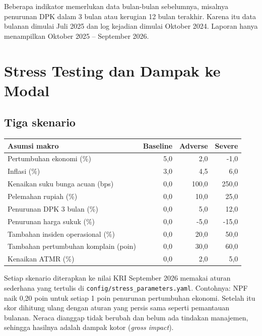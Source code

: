 \documentclass[11pt,a4paper]{article}
\newcommand{\file}[1]{\texttt{\small #1}}
\begin{document}
\begin{infobox}
Beberapa indikator memerlukan data bulan-bulan sebelumnya, misalnya penurunan DPK dalam 3 bulan atau kerugian 12 bulan terakhir. Karena itu data bulanan dimulai Juli 2025 dan log kejadian dimulai Oktober 2024. Laporan hanya menampilkan Oktober 2025 -- September 2026.
\end{infobox}
\section{Stress Testing dan Dampak ke Modal}\label{sec:stress}

\subsection{Tiga skenario}

\begin{center}
\begin{tabular}{lrrr}
\toprule
\textbf{Asumsi makro} & \textbf{Baseline} & \textbf{Adverse} & \textbf{Severe}\\
\midrule
Pertumbuhan ekonomi (\%) & 5{,}0 & 2{,}0 & -1{,}0\\
Inflasi (\%) & 3{,}0 & 4{,}5 & 6{,}0\\
Kenaikan suku bunga acuan (bps) & 0{,}0 & 100{,}0 & 250{,}0\\
Pelemahan rupiah (\%) & 0{,}0 & 10{,}0 & 25{,}0\\
Penurunan DPK 3 bulan (\%) & 0{,}0 & 5{,}0 & 12{,}0\\
Penurunan harga sukuk (\%) & 0{,}0 & -5{,}0 & -15{,}0\\
Tambahan insiden operasional (\%) & 0{,}0 & 20{,}0 & 50{,}0\\
Tambahan pertumbuhan komplain (poin) & 0{,}0 & 30{,}0 & 60{,}0\\
Kenaikan ATMR (\%) & 0{,}0 & 2{,}0 & 5{,}0\\
\bottomrule
\end{tabular}
\end{center}

Setiap skenario diterapkan ke nilai KRI September 2026 memakai aturan sederhana yang tertulis di \file{config/stress\_\allowbreak{}parameters.yaml}. Contohnya: NPF naik 0,20 poin untuk setiap 1 poin penurunan pertumbuhan ekonomi. Setelah itu skor dihitung ulang dengan aturan yang persis sama seperti pemantauan bulanan. Neraca dianggap tidak berubah dan belum ada tindakan manajemen, sehingga hasilnya adalah dampak kotor (\emph{gross impact}).
\end{document}
